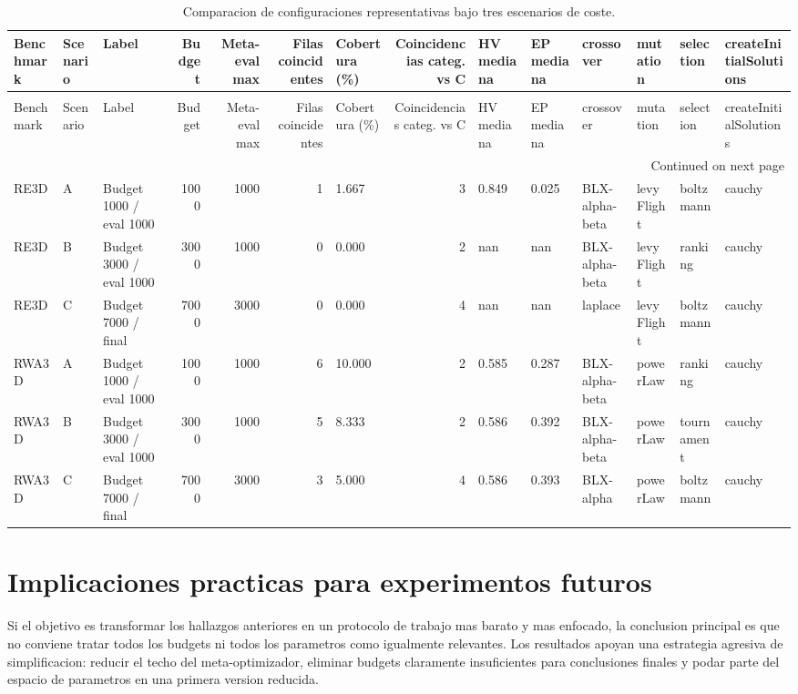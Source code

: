 \documentclass[11pt,a4paper]{article}
\begin{document}
{\scriptsize
\setlength{\LTpre}{0pt}
\setlength{\LTpost}{0pt}
\begin{longtable}{lllrrrlrllllll}
\caption{Comparacion de configuraciones representativas bajo tres escenarios de coste.} \label{tab:cost_scenarios} \\
\toprule
Benchmark & Scenario & Label & Budget & Meta-eval max & Filas coincidentes & Cobertura (\%) & Coincidencias categ. vs C & HV mediana & EP mediana & crossover & mutation & selection & createInitialSolutions \\
\midrule
\endfirsthead
\caption[]{Comparacion de configuraciones representativas bajo tres escenarios de coste.} \\
\toprule
Benchmark & Scenario & Label & Budget & Meta-eval max & Filas coincidentes & Cobertura (\%) & Coincidencias categ. vs C & HV mediana & EP mediana & crossover & mutation & selection & createInitialSolutions \\
\midrule
\endhead
\midrule
\multicolumn{14}{r}{Continued on next page} \\
\midrule
\endfoot
\bottomrule
\endlastfoot
RE3D & A & Budget 1000 / eval 1000 & 1000 & 1000 & 1 & 1.667 & 3 & 0.849 & 0.025 & BLX-alpha-beta & levyFlight & boltzmann & cauchy \\
RE3D & B & Budget 3000 / eval 1000 & 3000 & 1000 & 0 & 0.000 & 2 & nan & nan & BLX-alpha-beta & levyFlight & ranking & cauchy \\
RE3D & C & Budget 7000 / final & 7000 & 3000 & 0 & 0.000 & 4 & nan & nan & laplace & levyFlight & boltzmann & cauchy \\
RWA3D & A & Budget 1000 / eval 1000 & 1000 & 1000 & 6 & 10.000 & 2 & 0.585 & 0.287 & BLX-alpha-beta & powerLaw & ranking & cauchy \\
RWA3D & B & Budget 3000 / eval 1000 & 3000 & 1000 & 5 & 8.333 & 2 & 0.586 & 0.392 & BLX-alpha-beta & powerLaw & tournament & cauchy \\
RWA3D & C & Budget 7000 / final & 7000 & 3000 & 3 & 5.000 & 4 & 0.586 & 0.393 & BLX-alpha & powerLaw & boltzmann & cauchy \\
\end{longtable}

}

\section{Implicaciones practicas para experimentos futuros}

Si el objetivo es transformar los hallazgos anteriores en un protocolo de trabajo mas barato y mas enfocado, la conclusion principal es que no conviene tratar todos los budgets ni todos los parametros como igualmente relevantes. Los resultados apoyan una estrategia agresiva de simplificacion: reducir el techo del meta-optimizador, eliminar budgets claramente insuficientes para conclusiones finales y podar parte del espacio de parametros en una primera version reducida.
\end{document}
